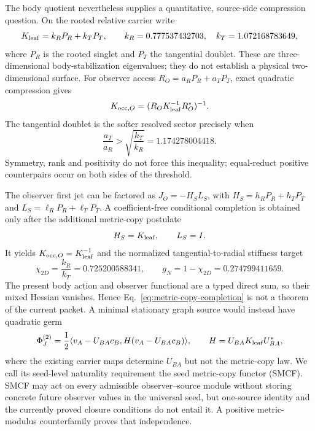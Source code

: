 \documentclass[11pt]{article}
\begin{document}
The body quotient nevertheless supplies a quantitative, source-side
compression question.  On the rooted relative carrier write
\begin{equation}
 K_{\rm leaf}=k_RP_R+k_TP_T,
 \qquad k_R=0.777537432703,
 \quad k_T=1.072168783649,
 \label{eq:leaf-stiffness-values}
\end{equation}
where $P_R$ is the rooted singlet and $P_T$ the tangential doublet.  These are
three-dimensional body-stabilization eigenvalues; they do not establish a
physical two-dimensional surface.  For observer access
$R_O=a_RP_R+a_TP_T$, exact quadratic compression gives
\begin{equation}
 K_{{\rm occ},O}=(R_OK_{\rm leaf}^{-1}R_O^*)^{-1}.
 \label{eq:observer-compression}
\end{equation}
The tangential doublet is the softer resolved sector precisely when
\begin{equation}
 \frac{a_T}{a_R}>\sqrt{\frac{k_T}{k_R}}=1.174278004418.
 \label{eq:access-threshold}
\end{equation}
Symmetry, rank and positivity do not force this inequality; equal-reduct
positive counterpairs occur on both sides of the threshold.

The observer first jet can be factored as $J_O=-H_SL_S$, with
$H_S=h_RP_R+h_TP_T$ and $L_S=\ell_RP_R+\ell_TP_T$.  A coefficient-free
conditional completion is obtained only after the additional metric-copy
postulate
\begin{equation}
 H_S=K_{\rm leaf},\qquad L_S=I.
 \label{eq:metric-copy-completion}
\end{equation}
It yields $K_{{\rm occ},O}=K_{\rm leaf}^{-1}$ and the normalized
tangential-to-radial stiffness target
\begin{equation}
 \chi_{2D}=\frac{k_R}{k_T}=0.725200588341,
 \qquad g_N=1-\chi_{2D}=0.274799411659.
 \label{eq:smcf-target}
\end{equation}
The present body action and observer functional are a typed direct sum, so
their mixed Hessian vanishes.  Hence Eq.~\eqref{eq:metric-copy-completion} is
not a theorem of the current packet.  A minimal stationary graph source would
instead have quadratic germ
\begin{equation}
 \Phi_J^{(2)}=\frac12\langle v_A-U_{BA}c_B,
 H(v_A-U_{BA}c_B)\rangle,
 \qquad H=U_{BA}K_{\rm leaf}U_{BA}^*,
 \label{eq:joint-metric-copy-germ}
\end{equation}
where the existing carrier maps determine $U_{BA}$ but not the metric-copy
law.  We call its seed-level naturality requirement the seed metric-copy
functor (SMCF).  SMCF may act on every admissible observer--source module
without storing concrete future observer values in the universal seed, but
one-source identity and the currently proved closure conditions do not entail
it.  A positive metric-modulus counterfamily proves that independence.
\end{document}
